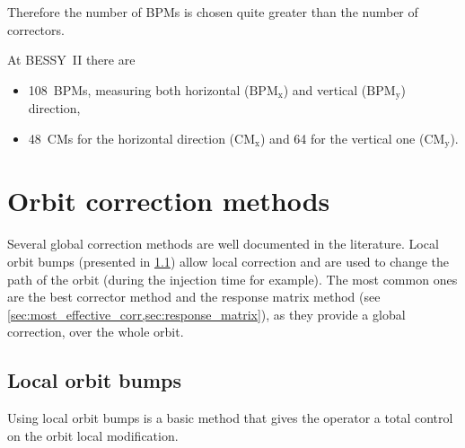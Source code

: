 Therefore the number of BPMs is chosen quite greater than the number of correctors.

At BESSY~II there are
\begin{itemize}
	\item 108~BPMs, measuring both horizontal ($\text{BPM}_\text{x}$) and vertical ($\text{BPM}_\text{y}$) direction,
	\item 48~CMs for the horizontal direction ($\text{CM}_\text{x}$) and 64 for the vertical one ($\text{CM}_\text{y}$).
\end{itemize}

\section{Orbit correction methods}
Several global correction methods are well documented in the literature. Local orbit bumps (presented in \cref{sec:orbit_bump}) allow local correction and are used to change the path of the orbit (during the injection time for example). The most common ones are the best corrector method and the response matrix method (see \cref{sec:most_effective_corr,sec:response_matrix}), as they provide a global correction, over the whole orbit.

\subsection{Local orbit bumps}
\label{sec:orbit_bump}
Using local orbit bumps is a basic method that gives the operator a total control on the orbit local modification.

